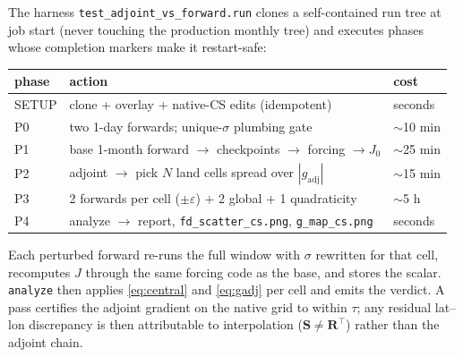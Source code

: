 \documentclass[12pt]{article}
\newcommand{\bm}[1]{\mathbf{#1}}
\newcommand{\gadj}{g_{\mathrm{adj}}}
\newcommand{\Robs}{\bm{R}}
\newcommand{\Sobs}{\bm{S}}
\begin{document}
The harness \texttt{test\_adjoint\_vs\_forward.run} clones a self-contained run
tree at job start (never touching the production monthly tree) and executes phases
whose completion markers make it restart-safe:
%
\begin{center}
\begin{tabular}{lll}
\toprule
phase & action & cost \\
\midrule
SETUP & clone + overlay + native-CS edits (idempotent) & seconds \\
P0 & two 1-day forwards; unique-$\sigma$ plumbing gate & $\sim$10 min \\
P1 & base 1-month forward $\to$ checkpoints $\to$ forcing $\to J_0$ & $\sim$25 min \\
P2 & adjoint $\to$ pick $N$ land cells spread over $|\gadj|$ & $\sim$15 min \\
P3 & 2 forwards per cell ($\pm\varepsilon$) $+$ 2 global $+$ 1 quadraticity & $\sim$5 h \\
P4 & analyze $\to$ report, \texttt{fd\_scatter\_cs.png}, \texttt{g\_map\_cs.png} & seconds \\
\bottomrule
\end{tabular}
\end{center}
%
Each perturbed forward re-runs the full window with $\sigma$ rewritten for that
cell, recomputes $J$ through the same forcing code as the base, and stores the
scalar. \texttt{analyze} then applies \eqref{eq:central} and \eqref{eq:gadj} per
cell and emits the verdict. A pass certifies the adjoint gradient on the native
grid to within $\tau$; any residual lat--lon discrepancy is then attributable to
interpolation ($\Sobs\ne\Robs^{\!\top}$) rather than the adjoint chain.
\end{document}
